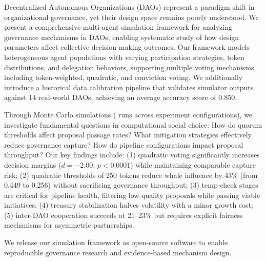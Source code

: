 
Decentralized Autonomous Organizations (DAOs) represent a paradigm shift in organizational governance, yet their design space remains poorly understood. We present a comprehensive multi-agent simulation framework for analyzing governance mechanisms in DAOs, enabling systematic study of how design parameters affect collective decision-making outcomes. Our framework models heterogeneous agent populations with varying participation strategies, token distributions, and delegation behaviors, supporting multiple voting mechanisms including token-weighted, quadratic, and conviction voting. We additionally introduce a historical data calibration pipeline that validates simulator outputs against 14 real-world DAOs, achieving an average accuracy score of 0.850.

Through Monte Carlo simulations (\totalruns{} runs across \experimentcount{} experiment configurations), we investigate fundamental questions in computational social choice: How do quorum thresholds affect proposal passage rates? What mitigation strategies effectively reduce governance capture? How do pipeline configurations impact proposal throughput? Our key findings include: (1) quadratic voting significantly increases decision margins ($d = -2.00$, $p < 0.0001$) while maintaining comparable capture risk; (2) quadratic thresholds of 250 tokens reduce whale influence by 43\% (from 0.449 to 0.256) without sacrificing governance throughput; (3) temp-check stages are critical for pipeline health, filtering low-quality proposals while passing viable initiatives; (4) treasury stabilization halves volatility with a minor growth cost; (5) inter-DAO cooperation succeeds at 21--23\% but requires explicit fairness mechanisms for asymmetric partnerships.

We release our simulation framework as open-source software to enable reproducible governance research and evidence-based mechanism design.